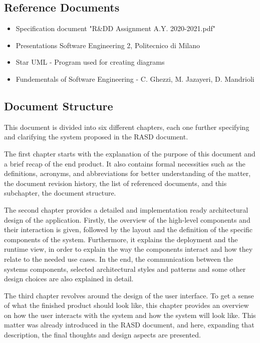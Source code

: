 \newpage
\subsection{Reference Documents}
\begin{itemize}
	\item Specification document "R\&DD Assignment A.Y. 2020-2021.pdf"
	\item Presentations Software Engineering 2, Politecnico di Milano
	\item Star UML - Program used for creating diagrams
	\item Fundementals of Software Engineering - C. Ghezzi, M. Jazayeri, D. Mandrioli
\end{itemize}


\newpage
\subsection{Document Structure}
\hspace{\parindent} This document is divided into six different chapters, each one further specifying and clarifying the system proposed in the RASD document. \newline

The first chapter starts with the explanation of the purpose of this document and a brief recap of the end product. It also contains formal necessities such as the definitions, acronyms, and abbreviations for better understanding of the matter, the document revision history, the list of referenced documents, and this subchapter, the document structure. \newline 

The second chapter provides a detailed and implementation ready architectural design of the application. Firstly, the overview of the high-level components and their interaction is given, followed by the layout and the definition of the specific components of the system. Furthermore, it explains the deployment and the runtime view, in order to explain the way the components interact and how they relate to the needed use cases. In the end, the communication between the systems components, selected architectural styles and patterns and some other design choices are also explained in detail. \newline

The third chapter revolves around the design of the user interface. To get a sense of what the finished product should look like, this chapter provides an overview on how the user interacts with the system and how the system will look like. This matter was already introduced in the RASD document, and here, expanding that description, the final thoughts and design aspects are presented. \newline

